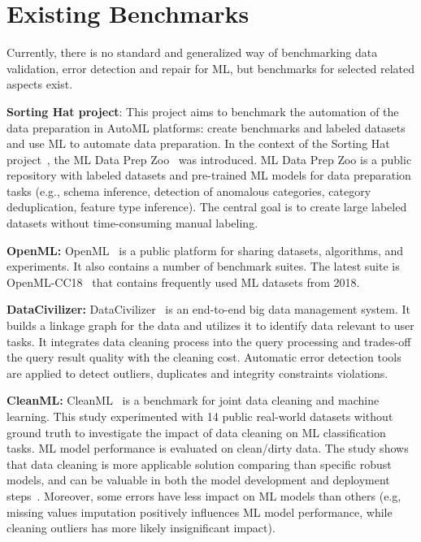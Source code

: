 
\section{Existing Benchmarks}
\label{sec:existing_benchmarks}

Currently, there is no standard and generalized way of benchmarking data validation, error detection and repair for ML, but benchmarks for selected related aspects exist.

\textbf{Sorting Hat project}: 
This project aims to benchmark the automation of the data preparation in AutoML platforms: create benchmarks and labeled datasets and use ML to automate data preparation.
In the context of the Sorting Hat project~\cite{sortinghat}, the ML Data Prep Zoo~\cite{prepzoo} was introduced.
ML Data Prep Zoo is a public repository with labeled datasets and pre-trained ML models for data preparation tasks (e.g., schema inference, detection of anomalous categories, category deduplication, feature type inference).
The central goal is to create large labeled datasets without time-consuming manual labeling.

\textbf{OpenML:} 
OpenML~\cite{openml_suites} is a public platform for sharing datasets, algorithms, and experiments. It also contains a number of benchmark suites. The latest suite is OpenML-CC18~\cite{openml_suites} that contains frequently used ML datasets from 2018.

\textbf{DataCivilizer:}
DataCivilizer~\cite{datacivil} is an end-to-end big data management system. 
It builds a linkage graph for the data and utilizes it to identify data relevant to user tasks. 
It integrates data cleaning process into the query processing and trades-off the query result quality with the cleaning cost. 
Automatic error detection tools are applied to detect outliers, duplicates and integrity constraints violations.

\textbf{CleanML:}
CleanML~\cite{cleanml} is a benchmark for joint data cleaning and machine learning.
This study experimented with 14 public real-world datasets without ground truth to investigate the impact of data cleaning on ML classification tasks. 
ML model performance is evaluated on clean/dirty data.
The study shows that data cleaning is more applicable solution comparing than specific robust models, and can be valuable in both the model development and deployment steps~\cite{cleanml}.
Moreover, some errors have less impact on ML models than others (e.g, missing values imputation positively influences ML model performance, while cleaning outliers has more likely insignificant impact). 

